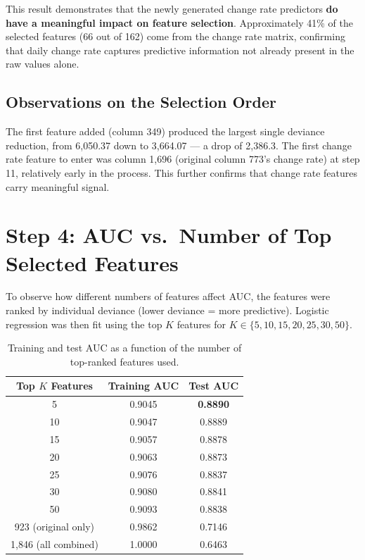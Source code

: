 \documentclass[12pt]{article}
\begin{document}
	This result demonstrates that the newly generated change rate predictors \textbf{do have a meaningful impact on feature selection}. Approximately 41\% of the selected features (66 out of 162) come from the change rate matrix, confirming that daily change rate captures predictive information not already present in the raw values alone.

	\subsection{Observations on the Selection Order}

	The first feature added (column 349) produced the largest single deviance reduction, from 6{,}050.37 down to 3{,}664.07 --- a drop of 2{,}386.3. The first change rate feature to enter was column 1{,}696 (original column 773's change rate) at step 11, relatively early in the process. This further confirms that change rate features carry meaningful signal.

	\newpage
	\section{Step 4: AUC vs.\ Number of Top Selected Features}\label{sec:topk}

	To observe how different numbers of features affect AUC, the features were ranked by individual deviance (lower deviance = more predictive). Logistic regression was then fit using the top $K$ features for $K \in \{5, 10, 15, 20, 25, 30, 50\}$.

	\begin{table}[H]
		\centering
		\caption{Training and test AUC as a function of the number of top-ranked features used.}\label{tab:topk}
		\begin{tabular}{ccc}
			\toprule
			\textbf{Top $K$ Features} & \textbf{Training AUC} & \textbf{Test AUC} \\
			\midrule
			5  & 0.9045 & \textbf{0.8890} \\
			10 & 0.9047 & 0.8889 \\
			15 & 0.9057 & 0.8878 \\
			20 & 0.9063 & 0.8873 \\
			25 & 0.9076 & 0.8837 \\
			30 & 0.9080 & 0.8841 \\
			50 & 0.9093 & 0.8838 \\
			\midrule
			923 (original only) & 0.9862 & 0.7146 \\
			1{,}846 (all combined) & 1.0000 & 0.6463 \\
			\bottomrule
		\end{tabular}
	\end{table}
\end{document}
